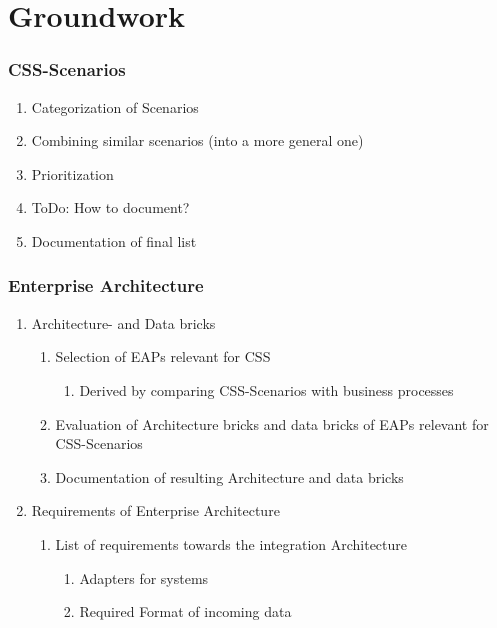 \documentclass[
     12pt,         %
     a4paper,      %
     BCOR10mm,     %
     DIV14,        %
     ]{scrreprt}
\begin{document}
\newpage

\chapter{Groundwork}

\subsection{CSS-Scenarios}
\begin{enumerate}
     \item Categorization of Scenarios
     \item Combining similar scenarios (into a more general one)
     \item Prioritization
     \item ToDo: How to document?
     \item Documentation of final list
\end{enumerate}

\subsection{Enterprise Architecture}
\begin{enumerate}
     \item Architecture- and Data bricks
           \begin{enumerate}
                \item Selection of EAPs relevant for CSS
                      \begin{enumerate}
                           \item Derived by comparing CSS-Scenarios with business processes
                      \end{enumerate}
                \item Evaluation of Architecture bricks and data bricks of EAPs relevant for CSS-Scenarios
                \item Documentation of resulting Architecture and data bricks
           \end{enumerate}

     \item Requirements of Enterprise Architecture
           \begin{enumerate}
                \item List of requirements towards the integration Architecture
                      \begin{enumerate}
                           \item Adapters for systems
                           \item Required Format of incoming data
                      \end{enumerate}
           \end{enumerate}
\end{enumerate}
\end{document}
